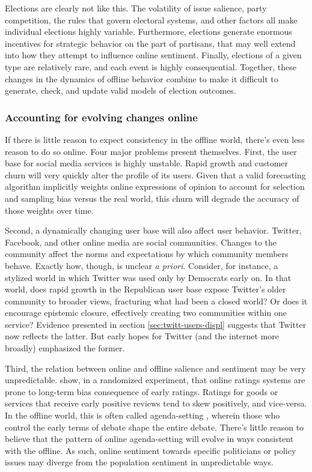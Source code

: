 \documentclass{article}
\begin{document}
Elections are clearly not like this. The volatility of issue salience,
party competition, the rules that govern electoral systems, and other
factors all make individual elections highly variable. Furthermore,
elections generate enormous incentives for strategic behavior on the
part of partisans, that may well extend into how they attempt to
influence online sentiment. Finally, elections of a given type are
relatively rare, and each event is highly consequential. Together,
these changes in the dynamics of offline behavior combine to make it
difficult to generate, check, and update valid models of election
outcomes.

\subsubsection{Accounting for evolving changes online}
\label{sec:acco-evolv-chang-1}

If there is little reason to expect consistency in the offline world,
there's even less reason to do so online. Four major problems present
themselves. First, the user base for social media services is highly
unstable. Rapid growth and customer churn will very quickly alter the
profile of its users. Given that a valid forecasting algorithm
implicitly weights online expressions of opinion to account for
selection and sampling bias versus the real world, this churn will
degrade the accuracy of those weights over time.

Second, a dynamically changing user base will also affect user
behavior. Twitter, Facebook, and other online media are social
communities. Changes to the community affect the norms and
expectations by which community members behave. Exactly how, though,
is unclear \textit{a priori}. Consider, for instance, a stylized world
in which Twitter was used only by Democrats early on. In that world,
does rapid growth in the Republican user base expose Twitter's older
community to broader views, fracturing what had been a closed world?
Or does it encourage epistemic closure, effectively creating two
communities within one service? Evidence presented in section
\ref{sec:twitt-users-displ} suggests that Twitter now reflects the
latter. But early hopes for Twitter (and the internet more broadly)
emphasized the former. 

Third, the relation between online and offline salience and sentiment
may be very unpredictable. \cite{Muchnik09082013} show, in a
randomized experiment, that online ratings systems are prone to
long-term bias consequence of early ratings. Ratings for goods or
services that receive early positive reviews tend to skew positively,
and vice-versa. In the offline world, this is often called
agenda-setting \citep{scheufele2007framing,scheufele2000agenda},
wherein those who control the early terms of debate shape the entire
debate. There's little reason to believe that the pattern of online
agenda-setting will evolve in ways consistent with the offline. As
such, online sentiment towards specific politicians or policy issues
may diverge from the population sentiment in unpredictable ways.
\end{document}
